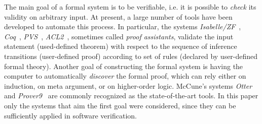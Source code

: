 \documentclass[article]{aaltoseries}
\begin{document}
The main goal of a formal system is to be verifiable, i.e. it is possible to \textit{check} its validity on arbitrary input. At present, a large number of tools have been developed to automate this process. In particular, the systems \textit{Isabelle/ZF}~\cite{tool_Isabelle}, \textit{Coq}~\cite{tool_Coq}, \textit{PVS}~\cite{tool_Pvs}, \textit{ACL2}~\cite{tool_Acl}, sometimes called \textit{proof assistants}, validate the input statement (used-defined theorem) with respect to the sequence of inference transitions (user-defined proof) according to set of rules (declared by user-defined formal theory)\textsl{}.
Another goal of constructing the formal system is having the computer to automatically \textit{discover} the formal proof, which can rely either on induction, on meta argument, or on higher-order logic. McCune’s systems \textit{Otter}~\cite{tool_Otter} and \textit{Prover9}~\cite{tool_Prover9} are commonly recognized as the state-of-the-art tools.
In this paper only the systems that aim the first goal were considered, since they can be sufficiently applied in software verification.
\end{document}
